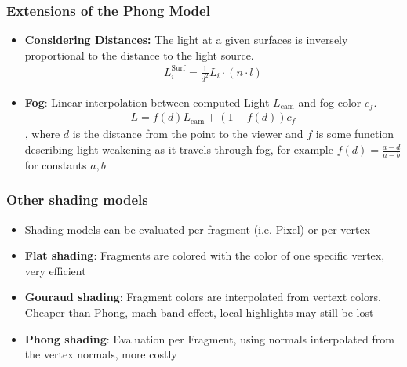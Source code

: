 \documentclass{scrartcl}
\begin{document}
\subsubsection*{Extensions of the Phong Model}
\begin{itemize}
    \item \textbf{Considering Distances:} The light at a given surfaces is inversely proportional to the distance to the light source. 
    \begin{align*}
        L^\text{Surf}_i = \frac{1}{d^2} L_i \cdot (n \cdot l)    
    \end{align*}
    \item \textbf{Fog}: Linear interpolation between computed Light $L_\text{cam}$ and fog color $c_f$. 
    \begin{align*}
        L = f(d) L_\text{cam} + (1-f(d))c_f    
    \end{align*}, where $d$ is the distance from the point to the viewer and $f$ is some function describing light weakening as it travels through fog, for example $f(d) = \frac{a-d}{a-b}$ for constants $a,b$
\end{itemize}
\subsubsection*{Other shading models}
\begin{itemize}
    \item Shading models can be evaluated per fragment (i.e. Pixel) or per vertex
    \item \textbf{Flat shading}: Fragments are colored with the color of one specific vertex, very efficient
    \item \textbf{Gouraud shading}: Fragment colors are interpolated from vertext colors. Cheaper than Phong, mach band effect, local highlights may still be lost
    \item \textbf{Phong shading}: Evaluation per Fragment, using normals interpolated from the vertex normals, more costly
\end{itemize}
\end{document}
